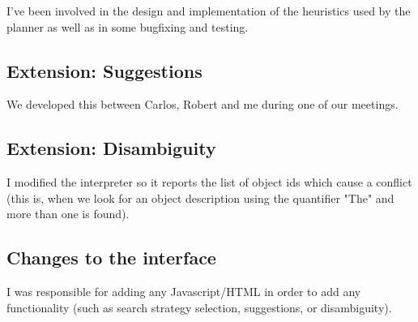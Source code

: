 \documentclass[11pt]{article}
\begin{document}
I've been involved in the design and implementation of the heuristics used by the planner as well as in some 
bugfixing and testing.

\subsection{Extension: Suggestions}

We developed this between Carlos, Robert and me during one of our meetings.

\subsection{Extension: Disambiguity}

I modified the interpreter so it reports the list of object ids which cause a conflict (this is, 
when we look for an object description using the quantifier "The" and more than one is found).

\subsection{Changes to the interface}

I was responsible for adding any Javascript/HTML in order to add any functionality (such as search strategy selection, suggestions, or disambiguity). 
\end{document}
